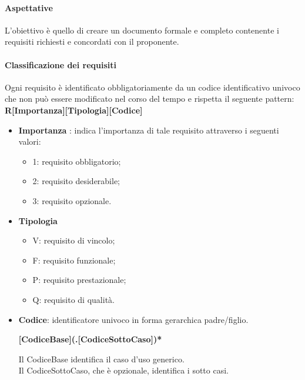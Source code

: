 \paragraph{Aspettative}
L'obiettivo è quello di creare un documento formale e completo contenente i requisiti richiesti e concordati con il proponente.

\paragraph{Classificazione dei requisiti} \label{_classificazioneRequisiti}
Ogni requisito è identificato obbligatoriamente da un codice identificativo univoco che non può essere modificato nel corso del tempo e rispetta il seguente pattern: \\
\textbf{R[Importanza][Tipologia][Codice]}

\begin{itemize}
  \item 	\textbf{Importanza} : indica l'importanza di tale requisito attraverso i seguenti valori:
        \begin{itemize}
          \item 1: requisito obbligatorio;
          \item 2: requisito desiderabile;
          \item 3: requisito opzionale.
        \end{itemize}
  \item \textbf{Tipologia}
        \begin{itemize}
          \item V: requisito di vincolo;
          \item F: requisito funzionale;
          \item P: requisito prestazionale;
          \item Q: requisito di qualità.
        \end{itemize}
  \item \textbf{Codice}: identificatore univoco in forma gerarchica padre/figlio. 
  	\begin{center}
  	 \textbf{[CodiceBase](.[CodiceSottoCaso])*} \\
  	\end{center}
       

        Il CodiceBase identifica il caso d'uso generico. \\
        Il CodiceSottoCaso, che è opzionale, identifica i sotto casi.
\end{itemize}

